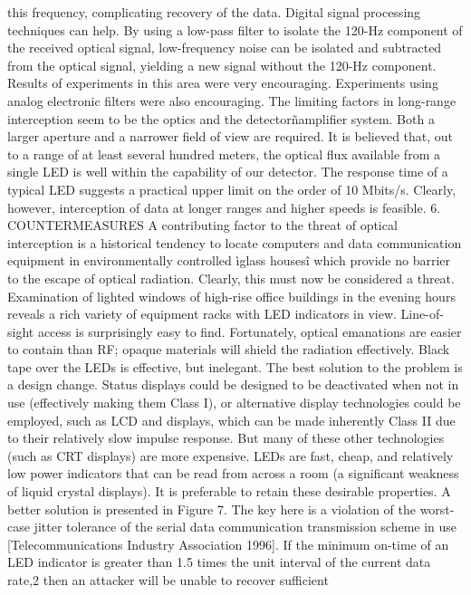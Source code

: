 this frequency, complicating recovery of the data. 
Digital signal processing techniques can help. By using a low-pass filter to 
isolate the 120-Hz component of the received optical signal, low-frequency noise 
can be isolated and subtracted from the optical signal, yielding a new signal 
without the 120-Hz component. Results of experiments in this area were very 
encouraging. Experiments using analog electronic filters were also encouraging. 
The limiting factors in long-range interception seem to be the optics and 
the detectorñamplifier system. Both a larger aperture and a narrower field of 
view are required. It is believed that, out to a range of at least several hundred 
meters, the optical flux available from a single LED is well within the capability 
of our detector. The response time of a typical LED suggests a practical upper 
limit on the order of 10 Mbits/s. Clearly, however, interception of data at longer 
ranges and higher speeds is feasible. 
6. COUNTERMEASURES 
A contributing factor to the threat of optical interception is a historical tendency 
to locate computers and data communication equipment in environmentally 
controlled ìglass housesî which provide no barrier to the escape of optical 
radiation. Clearly, this must now be considered a threat. 
Examination of lighted windows of high-rise office buildings in the evening 
hours reveals a rich variety of equipment racks with LED indicators in view. 
Line-of-sight access is surprisingly easy to find. Fortunately, optical emanations 
are easier to contain than RF; opaque materials will shield the radiation 
effectively. 
Black tape over the LEDs is effective, but inelegant. The best solution to 
the problem is a design change. Status displays could be designed to be deactivated 
when not in use (effectively making them Class I), or alternative display 
technologies could be employed, such as LCD and displays, which can be made 
inherently Class II due to their relatively slow impulse response. But many of 
these other technologies (such as CRT displays) are more expensive. LEDs are 
fast, cheap, and relatively low power indicators that can be read from across 
a room (a significant weakness of liquid crystal displays). It is preferable to 
retain these desirable properties. 
A better solution is presented in Figure 7. The key here is a violation of 
the worst-case jitter tolerance of the serial data communication transmission 
scheme in use [Telecommunications Industry Association 1996]. If the minimum 
on-time of an LED indicator is greater than 1.5 times the unit interval 
of the current data rate,2 then an attacker will be unable to recover sufficient 
